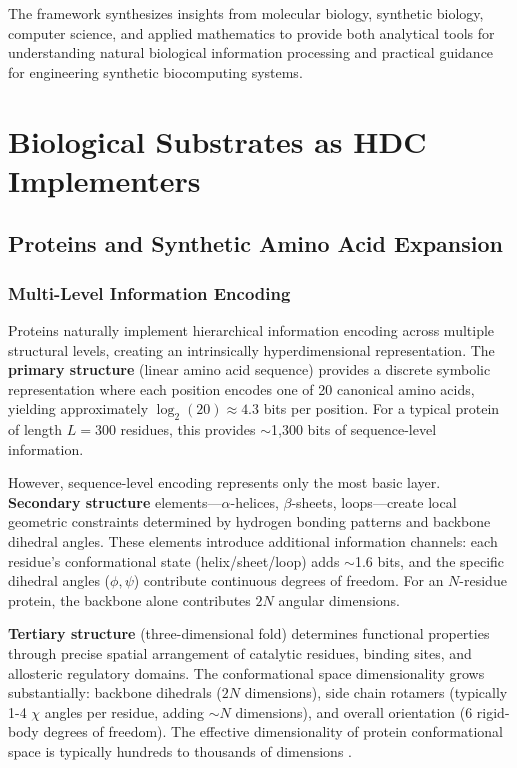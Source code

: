 \documentclass[12pt]{article}
\begin{document}
The framework synthesizes insights from molecular biology, synthetic biology, computer science, and applied mathematics to provide both analytical tools for understanding natural biological information processing and practical guidance for engineering synthetic biocomputing systems.

\section{Biological Substrates as HDC Implementers}

\subsection{Proteins and Synthetic Amino Acid Expansion}

\subsubsection{Multi-Level Information Encoding}

Proteins naturally implement hierarchical information encoding across multiple structural levels, creating an intrinsically hyperdimensional representation. The \textbf{primary structure} (linear amino acid sequence) provides a discrete symbolic representation where each position encodes one of 20 canonical amino acids, yielding approximately $\log_2(20) \approx 4.3$ bits per position. For a typical protein of length $L = 300$ residues, this provides $\sim$1,300 bits of sequence-level information.

However, sequence-level encoding represents only the most basic layer. \textbf{Secondary structure} elements—$\alpha$-helices, $\beta$-sheets, loops—create local geometric constraints determined by hydrogen bonding patterns and backbone dihedral angles. These elements introduce additional information channels: each residue's conformational state (helix/sheet/loop) adds $\sim$1.6 bits, and the specific dihedral angles ($\phi, \psi$) contribute continuous degrees of freedom. For an $N$-residue protein, the backbone alone contributes $2N$ angular dimensions.

\textbf{Tertiary structure} (three-dimensional fold) determines functional properties through precise spatial arrangement of catalytic residues, binding sites, and allosteric regulatory domains. The conformational space dimensionality grows substantially: backbone dihedrals ($2N$ dimensions), side chain rotamers (typically 1-4 $\chi$ angles per residue, adding $\sim N$ dimensions), and overall orientation (6 rigid-body degrees of freedom). The effective dimensionality of protein conformational space is typically hundreds to thousands of dimensions \citep{Huang2016}.
\end{document}

